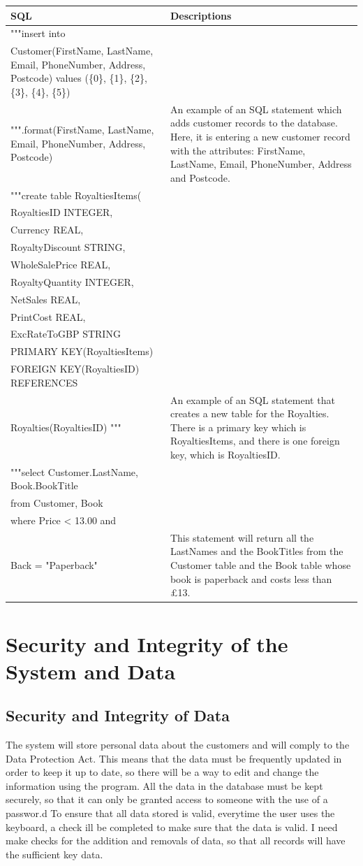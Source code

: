 \begin{tabular}{|p{10cm}|p{5cm}|}
    \hline
    \textbf{SQL} & \textbf{Descriptions} \\ \hline 
     """insert into \\ Customer(FirstName, LastName, Email, PhoneNumber, Address, Postcode) values (\{0\}, \{1\}, \{2\}, \{3\}, \{4\}, \{5\}) \\ """.format(FirstName, LastName, Email, PhoneNumber, Address, Postcode) & An example of an SQL statement which adds customer records to the database. Here, it is entering a new customer record with the attributes: FirstName, LastName, Email, PhoneNumber, Address and Postcode. \\ \hline
    """create table RoyaltiesItems(\\ RoyaltiesID INTEGER, \\ Currency REAL, \\ RoyaltyDiscount STRING,\\  WholeSalePrice REAL,\\ RoyaltyQuantity INTEGER,\\ NetSales REAL,\\ PrintCost REAL, \\ ExcRateToGBP STRING \\ PRIMARY KEY(RoyaltiesItems) \\ FOREIGN KEY(RoyaltiesID) REFERENCES \\ Royalties(RoyaltiesID) """ & An example of an SQL statement that creates a new table for the Royalties. There is a primary key which is RoyaltiesItems, and there is one foreign key, which is RoyaltiesID. \\ \hline 
    """select Customer.LastName, Book.BookTitle \\ from Customer, Book \\ where Price < 13.00 and \\ Back = "Paperback"  & This statement will return all the LastNames and the BookTitles from the Customer table and the Book table whose book is paperback and costs less than £13. \\ \hline
\end{tabular}

\section{Security and Integrity of the System and Data}

\subsection{Security and Integrity of Data}
The system will store personal data about the customers and will comply to the Data Protection Act. This means that the data must be frequently updated in order to keep it up to date, so there will be a way to edit and change the information using the program. All the data in the database must be kept securely, so that it can only be granted access to someone with the use of a passwor.d To ensure that all data stored is valid, everytime the user uses the keyboard, a check ill be completed to make sure that the data is valid. I need make checks for the addition and removals of data, so that all records will have the sufficient key data.

